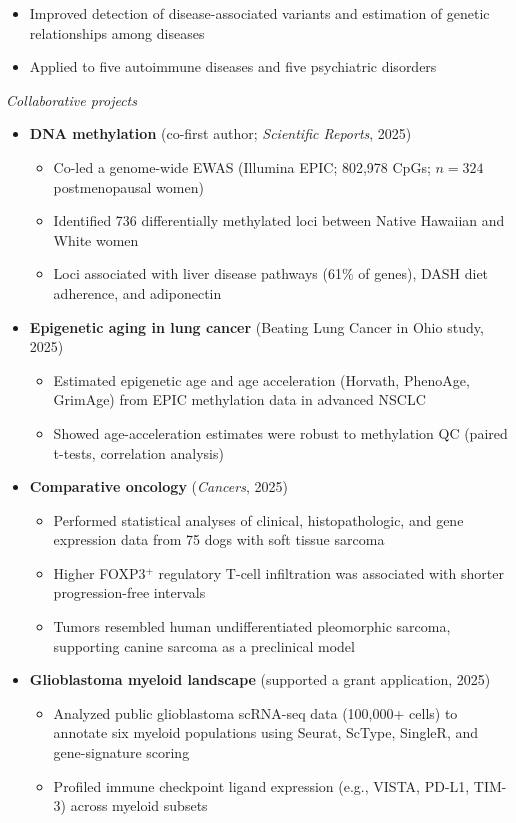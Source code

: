 \documentclass[11pt,a4paper,roman]{moderncv}        %
\begin{document}
{{\begin{itemize}
\begin{itemize}
    \item Improved detection of disease-associated variants and estimation of genetic relationships among diseases
    \item Applied to five autoimmune diseases and five psychiatric disorders
  \end{itemize}
\end{itemize}
\textit{Collaborative projects}
\begin{itemize}
  \item \textbf{DNA methylation} (co-first author; \textit{Scientific Reports}, 2025)
  \begin{itemize}
    \item Co-led a genome-wide EWAS (Illumina EPIC; 802,978 CpGs; $n = 324$ postmenopausal women)
    \item Identified 736 differentially methylated loci between Native Hawaiian and White women
    \item Loci associated with liver disease pathways (61\% of genes), DASH diet adherence, and adiponectin
  \end{itemize}
  \item \textbf{Epigenetic aging in lung cancer} (Beating Lung Cancer in Ohio study, 2025)
  \begin{itemize}
    \item Estimated epigenetic age and age acceleration (Horvath, PhenoAge, GrimAge) from EPIC methylation data in advanced NSCLC
    \item Showed age-acceleration estimates were robust to methylation QC (paired t-tests, correlation analysis)
  \end{itemize}
  \item \textbf{Comparative oncology} (\textit{Cancers}, 2025)
  \begin{itemize}
    \item Performed statistical analyses of clinical, histopathologic, and gene expression data from 75 dogs with soft tissue sarcoma
    \item Higher FOXP3$^+$ regulatory T-cell infiltration was associated with shorter progression-free intervals
    \item Tumors resembled human undifferentiated pleomorphic sarcoma, supporting canine sarcoma as a preclinical model
  \end{itemize}
    \item \textbf{Glioblastoma myeloid landscape} (supported a grant application, 2025)
  \begin{itemize}
   \item Analyzed public glioblastoma scRNA-seq data (100,000+ cells) to annotate six myeloid populations using Seurat, ScType, SingleR, and gene-signature scoring
    \item Profiled immune checkpoint ligand expression (e.g., VISTA, PD-L1, TIM-3) across myeloid subsets
  \end{itemize}
\end{itemize}
}}
\end{document}
